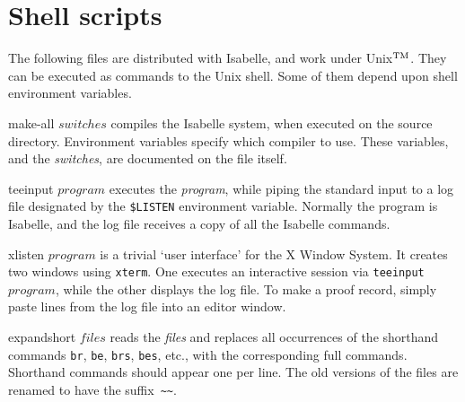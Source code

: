 \section{Shell scripts}\label{sec:shell-scripts}
 The following files are distributed with
Isabelle, and work under Unix$^{\rm TM}$.  They can be executed as commands
to the Unix shell.  Some of them depend upon shell environment variables.
\begin{ttdescription}
\item[make-all $switches$] 
  compiles the Isabelle system, when executed on the source directory.
  Environment variables specify which \ML{} compiler to use.  These
  variables, and the {\it switches}, are documented on the file itself.

\item[teeinput $program$] 
  executes the {\it program}, while piping the standard input to a log file
  designated by the \verb|$LISTEN| environment variable.  Normally the
  program is Isabelle, and the log file receives a copy of all the Isabelle
  commands.

\item[xlisten $program$] 
  is a trivial `user interface' for the X Window System.  It creates two
  windows using {\tt xterm}.  One executes an interactive session via
  \hbox{\tt teeinput $program$}, while the other displays the log file.  To
  make a proof record, simply paste lines from the log file into an editor
  window.

\item[expandshort $files$]  
  reads the {\it files\/} and replaces all occurrences of the shorthand
  commands {\tt br}, {\tt be}, {\tt brs}, {\tt bes}, etc., with the
  corresponding full commands.  Shorthand commands should appear one
  per line.  The old versions of the files
  are renamed to have the suffix~\verb'~~'.
\end{ttdescription}

